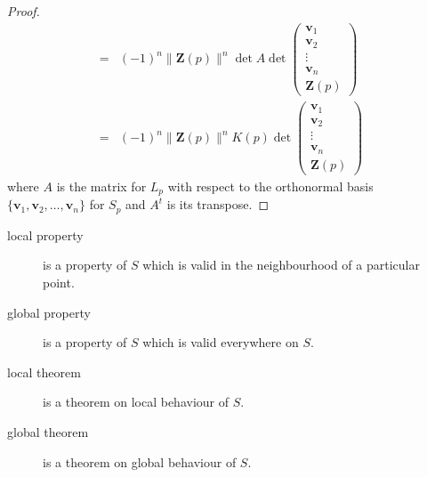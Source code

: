\begin{proof}
\begin{align*}
	= & (-1)^n \| \boldsymbol{Z}(p) \|^n \det A \det \begin{pmatrix} \boldsymbol{v}_1 \\ \boldsymbol{v}_2 \\ \vdots \\ \boldsymbol{v}_n \\ \boldsymbol{Z}(p) \end{pmatrix} \\
	= & (-1)^n \| \boldsymbol{Z}(p) \|^n K(p) \det \begin{pmatrix} \boldsymbol{v}_1 \\ \boldsymbol{v}_2 \\ \vdots \\ \boldsymbol{v}_n \\ \boldsymbol{Z}(p) \end{pmatrix} 
	\end{align*}
	where $A$ is the matrix for $L_p$ with respect to the orthonormal basis $\{ \boldsymbol{v}_1, \boldsymbol{v}_2, \dots, \boldsymbol{v}_n\}$ for $S_p$ and $A^t$ is its transpose.
\endgroup
\end{proof}

\begin{description}
	\item[local property] is a property of $S$ which is valid in the neighbourhood of a particular point.
	\item[global property] is a property of $S$ which is valid everywhere on $S$.
	\item[local theorem] is a theorem on local behaviour of $S$.
	\item[global theorem] is a theorem on global behaviour of $S$.
\end{description}

